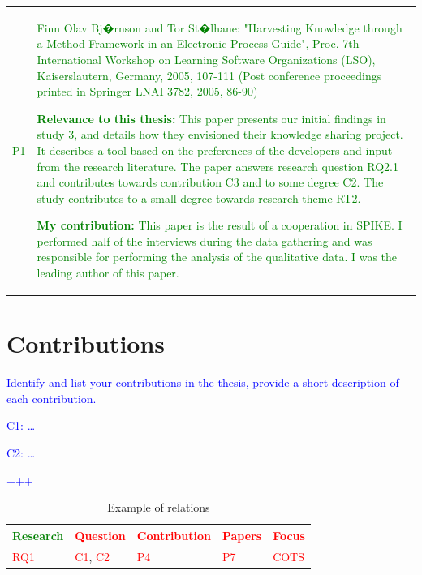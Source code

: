 \begin{table}[!h]
\begin{tabular}{lp{}} 

\textcolor{green}{P1} &

\textcolor{green}{Finn Olav Bj�rnson and Tor St�lhane: "Harvesting Knowledge through a Method Framework in an Electronic 
Process Guide", Proc. 7th International Workshop on Learning Software Organizations (LSO), Kaiserslautern, Germany, 
2005, 107-111 (Post conference proceedings printed in Springer LNAI 3782, 2005, 86-90)}

\textcolor{green}{\textbf{Relevance to this thesis:} This paper presents our initial findings in study 3, and details 
how they envisioned their knowledge sharing project. It describes a tool based on the preferences of the developers and 
input from the research literature. The paper answers research question RQ2.1 and contributes towards contribution C3 
and to some degree C2. The study contributes to a small degree towards research theme RT2.}

\textcolor{green}{\textbf{My contribution:} This paper is the result of a cooperation in SPIKE. I performed half of the 
interviews during the data gathering and was responsible for performing the analysis of the qualitative data. I was the 
leading author of this paper.} \\

\end{tabular}
\end{table}

	

\section{Contributions}
\textcolor{blue}{Identify and list your contributions in the thesis, provide a short description of each contribution.}

\textcolor{blue}{C1: \ldots}

\textcolor{blue}{C2: \ldots}

\textcolor{blue}{+++}


\begin{table}[!h]
\centering
\begin{tabular}{|l|l|l|l|l|} 
\hline
\textcolor{green}{Research} & \textcolor{red}{Question} & \textcolor{red}{Contribution} & \textcolor{red}{Papers} & \textcolor{red}{Focus} \\
\hline
\textcolor{red}{RQ1} & \textcolor{red}{C1}, \textcolor{red}{C2} & \textcolor{red}{P4} & \textcolor{red}{P7} & \textcolor{red}{COTS} \\
\hline

\end{tabular}
\caption{Example of relations}
\label{tab:1-relations}
\end{table}


